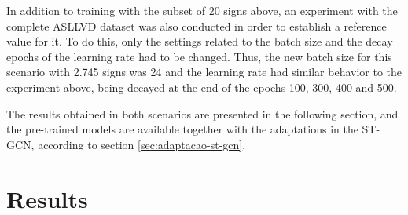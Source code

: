 

In addition to training with the subset of 20 signs above, an experiment with the complete ASLLVD dataset was also conducted in order to establish a reference value for it. To do this, only the settings related to the batch size and the decay epochs of the learning rate had to be changed. Thus, the new batch size for this scenario with 2.745 signs was 24 and the learning rate had similar behavior to the experiment above, being decayed at the end of the epochs 100, 300, 400 and 500.


The results obtained in both scenarios are presented in the following section, and the pre-trained models are available together with the adaptations in the ST-GCN, according to section \ref{sec:adaptacao-st-gcn}.



\section{Results} %
\label{sec:resultados}

